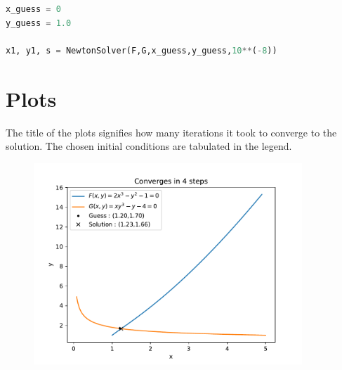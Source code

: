 \documentclass[a4paper,10pt]{article}
\begin{document}
\begin{lstlisting}[language=python]
x_guess = 0
y_guess = 1.0

x1, y1, s = NewtonSolver(F,G,x_guess,y_guess,10**(-8))
\end{lstlisting}


\vspace{80pt}
\newpage
\section*{Plots}
The title of the plots signifies how many iterations it took to converge to the solution. The chosen initial conditions are tabulated in the legend.

\begin{figure}[H]
\centering
\includegraphics[width=0.9\textwidth]{Figure_1} 
\end{figure}

\begin{figure}[H]
\end{figure}
\end{document}
